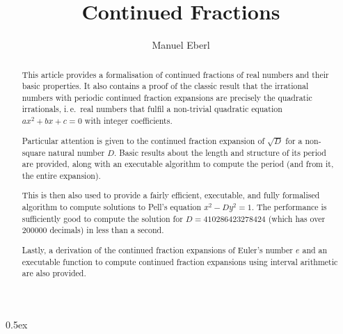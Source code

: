 \documentclass[11pt,a4paper]{article}
\begin{document}
\title{Continued Fractions}
\author{Manuel Eberl}
\maketitle

\begin{abstract}
This article provides a formalisation of continued fractions of real numbers and their basic properties.
It also contains a proof of the classic result that the irrational numbers with periodic continued fraction expansions are precisely the quadratic irrationals, i.\,e.\ real numbers that fulfil a non-trivial quadratic equation $a x^2 + b x + c = 0$ with integer coefficients.

Particular attention is given to the continued fraction expansion of $\sqrt{D}$ for a non-square natural number $D$. Basic results about the length and structure of its period are provided, along with an executable algorithm to compute the period (and from it, the entire expansion).

This is then also used to provide a fairly efficient, executable, and fully formalised algorithm to compute solutions to Pell's equation $x^2 - D y^2 = 1$. The performance is sufficiently good to compute the solution for $D = 410286423278424$ (which has over 200000 decimals) in less than a second.

Lastly, a derivation of the continued fraction expansions of Euler's number $e$ and an executable function to compute continued fraction expansions using interval arithmetic are also provided.
\end{abstract}

\newpage
\tableofcontents
\newpage
\parindent 0pt\parskip 0.5ex





\end{document}
